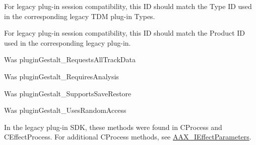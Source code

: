 \begin{DoxyRefList}
 For legacy plug-\/in session compatibility, this ID should match the Type ID used in the corresponding legacy TDM plug-\/in Types.  
\item[Member \mbox{\hyperlink{a00737_a13e384f22825afd3db6d68395b79ce0da3a41fcdff5af1a4fd19dcbca7b1ba6f3}{AAX\+\_\+e\+Property\+\_\+\+Product\+ID}} ]\label{a00880__porting_notes000042}%
%
 For legacy plug-\/in session compatibility, this ID should match the Product ID used in the corresponding legacy plug-\/in.  
\item[Member \mbox{\hyperlink{a00737_a13e384f22825afd3db6d68395b79ce0daa59caaf3d7c3e195a32b8cb09a9baac2}{AAX\+\_\+e\+Property\+\_\+\+Requests\+All\+Track\+Data}} ]\label{a00880__porting_notes000052}%
%
 Was plugin\+Gestalt\+\_\+\+Requests\+All\+Track\+Data  
\item[Member \mbox{\hyperlink{a00737_a13e384f22825afd3db6d68395b79ce0da925c49bb79454b33bf1d5f4cb09d373f}{AAX\+\_\+e\+Property\+\_\+\+Requires\+Analysis}} ]\label{a00880__porting_notes000048}%
%
 Was plugin\+Gestalt\+\_\+\+Requires\+Analysis  
\item[Member \mbox{\hyperlink{a00737_a13e384f22825afd3db6d68395b79ce0da6d42a3a901f36b74e7b9b8a84d4d5298}{AAX\+\_\+e\+Property\+\_\+\+Supports\+Save\+Restore}} ]\label{a00880__porting_notes000058}%
%
 Was plugin\+Gestalt\+\_\+\+Supports\+Save\+Restore  
\item[Member \mbox{\hyperlink{a00737_a13e384f22825afd3db6d68395b79ce0dab0bbaabe0a03b37e5a69f04a6f306076}{AAX\+\_\+e\+Property\+\_\+\+Uses\+Random\+Access}} ]\label{a00880__porting_notes000047}%
%
 Was plugin\+Gestalt\+\_\+\+Uses\+Random\+Access  
\item[Class \mbox{\hyperlink{a02064}{AAX\+\_\+\+IACFEffect\+GUI}} ]\label{a00880__porting_notes000030}%
%
 In the legacy plug-\/in SDK, these methods were found in CProcess and CEffect\+Process. For additional CProcess methods, see \mbox{\hyperlink{a02268}{AAX\+\_\+\+IEffect\+Parameters}}. 
\item[Member \mbox{\hyperlink{a02064_a3922a4b9fef09e88440d7655422c2b96}{AAX\+\_\+\+IACFEffect\+GUI\+::Set\+Control\+Highlight\+Info}} (AAX\+\_\+\+CParam\+ID i\+Parameter\+ID, AAX\+\_\+\+CBoolean i\+Is\+Highlighted, AAX\+\_\+\+EHighlight\+Color i\+Color)=0]\label{a00880__porting_notes000031}%
%

\end{DoxyRefList}
